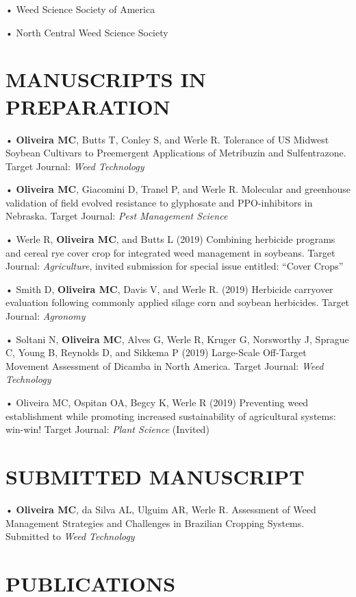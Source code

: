 \documentclass[11pt,]{article}
\begin{document}
• Weed Science Society of America

• North Central Weed Science Society

\hypertarget{manuscripts-in-preparation}{%
\section{MANUSCRIPTS IN PREPARATION}\label{manuscripts-in-preparation}}

• \textbf{Oliveira MC}, Butts T, Conley S, and Werle R. Tolerance of US
Midwest Soybean Cultivars to Preemergent Applications of Metribuzin and
Sulfentrazone. Target Journal: \emph{Weed Technology}

• \textbf{Oliveira MC}, Giacomini D, Tranel P, and Werle R. Molecular
and greenhouse validation of field evolved resistance to glyphosate and
PPO-inhibitors in Nebraska. Target Journal: \emph{Pest Management
Science}

• Werle R, \textbf{Oliveira MC}, and Butts L (2019) Combining herbicide
programs and cereal rye cover crop for integrated weed management in
soybeans. Target Journal: \emph{Agriculture}, invited submission for
special issue entitled: ``Cover Crops''

• Smith D, \textbf{Oliveira MC}, Davis V, and Werle R. (2019) Herbicide
carryover evaluation following commonly applied silage corn and soybean
herbicides. Target Journal: \emph{Agronomy}

• Soltani N, \textbf{Oliveira MC}, Alves G, Werle R, Kruger G,
Norsworthy J, Sprague C, Young B, Reynolds D, and Sikkema P (2019)
Large-Scale Off-Target Movement Assessment of Dicamba in North America.
Target Journal: \emph{Weed Technology}

• Oliveira MC, Ospitan OA, Begcy K, Werle R (2019) Preventing weed
establishment while promoting increased sustainability of agricultural
systems: win-win! Target Journal: \emph{Plant Science} (Invited)

\hypertarget{submitted-manuscript}{%
\section{SUBMITTED MANUSCRIPT}\label{submitted-manuscript}}

• \textbf{Oliveira MC}, da Silva AL, Ulguim AR, Werle R. Assessment of
Weed Management Strategies and Challenges in Brazilian Cropping Systems.
Submitted to \emph{Weed Technology}

\hypertarget{publications}{%
\section{PUBLICATIONS}\label{publications}}
\end{document}
